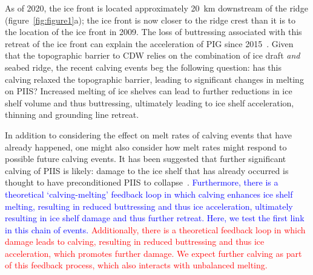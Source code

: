 \documentclass[draft]{agujournal2019}
\newcommand{\red}[1]{\textcolor{red}{#1}}
\newcommand{\blue}[1]{\textcolor{blue}{#1}}
\begin{document}
As of 2020, the ice front is located approximately 20~km downstream of the ridge (figure~\ref{fig:figure1}a); the ice front is now closer to the ridge crest than it is to the location of the ice front in 2009. The loss of buttressing associated with this retreat of the ice front can explain the acceleration of PIG since 2015~\cite{Joughin2021ScienceAdv}. Given that the topographic barrier to CDW relies on the combination of ice draft \textit{and} seabed ridge, the recent calving events beg the following question: has this calving relaxed the topographic barrier, leading to significant changes in melting on PIIS? Increased melting of ice shelves can lead to further reductions in ice shelf volume and thus buttressing, ultimately leading to ice shelf acceleration, thinning and grounding line retreat.

In addition to considering the effect on melt rates of calving events that have already happened, one might also consider how melt rates might respond to possible future calving events. It has been suggested that further significant calving of PIIS is likely: damage to the ice shelf that has already occurred is thought to have preconditioned PIIS to collapse~\cite{Lhermitte2020PNAS}. \blue{Furthermore, there is a theoretical `calving-melting' feedback loop in which calving enhances ice shelf melting, resulting in reduced buttressing and thus ice acceleration, ultimately resulting in ice shelf damage and thus further retreat. Here, we test the first link in this chain of events.} %
 \red{Additionally, there is a theoretical feedback loop in which damage leads to calving, resulting in reduced buttressing and thus ice acceleration, which promotes further damage. We expect further calving as part of this feedback process, which also interacts with unbalanced melting.}
\end{document}
